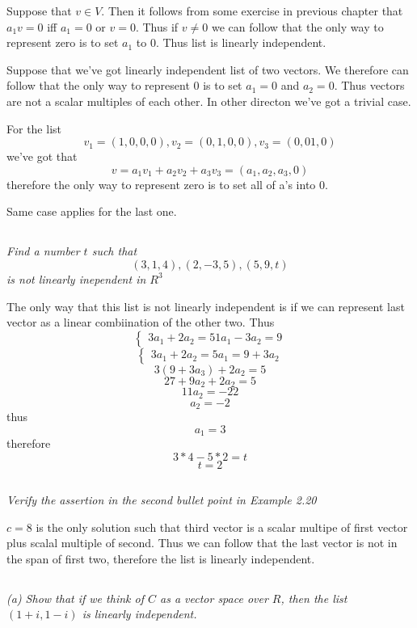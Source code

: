 \documentclass[11pt,oneside,titlepage]{book}
\begin{document}
Suppose that $v \in V$. Then it follows from some exercise in previous
chapter that $a_1 v = 0$ iff $a_1 = 0$ or $v = 0$. Thus if $v \neq 0$ we
can follow that the only way to represent zero is to set $a_1$ to 0. Thus
list is linearly independent.


Suppose that we've got linearly independent list of two vectors. We therefore
can follow that the only way to represent 0 is to set
$a_1 = 0$ and $a_2 = 0$. Thus vectors are not a scalar multiples of each other.
In other directon we've got a trivial case.

For the list
$$v_1 = (1, 0, 0, 0), v_2 = (0, 1, 0, 0), v_3 = (0, 0 1, 0)$$
we've got that
$$v = a_1 v_1 + a_2 v_2 + a_3 v_3 = (a_1, a_2, a_3, 0)$$
therefore the only way to represent zero is to set all of a's into 0.

Same case applies for the last one.

\subsection{}
\textit{Find a number $t$ such that}
$$(3, 1, 4), (2, -3, 5), (5, 9, t)$$
\textit{is not linearly inependent in $R^3$}

The only way that this list is not linearly independent is if 
we can represent last vector as a linear combiination of the other two. Thus
$$
\begin{cases}
  3 a_1 + 2 a_2 = 5
  1 a_1 - 3 a_2 = 9
\end{cases}
$$
$$
\begin{cases}
  3 a_1 + 2 a_2 = 5
  a_1= 9 +  3 a_2
\end{cases}
$$
$$   3 (9 +  3 a_3) + 2 a_2 = 5 $$
$$   27 +  9 a_2 + 2 a_2 = 5 $$
$$ 11 a_2= -22$$
$$ a_2 = -2$$
thus
$$a_1 = 3$$
therefore
$$3 * 4 - 5 * 2 = t$$
$$t = 2$$

\subsection{}
\textit{Verify the assertion in the second bullet point in Example 2.20}

$c = 8$ is the only solution such that third vector is a
scalar multipe of first vector plus scalal multiple of second. Thus we
can follow that the last vector is not in the span of first two, therefore
the list is linearly independent.

\subsection{}
\textit{(a) Show that if we think of $C$ as a vector space over $R$, then the
  list $(1 + i, 1 - i)$ is linearly independent.}
\end{document}
